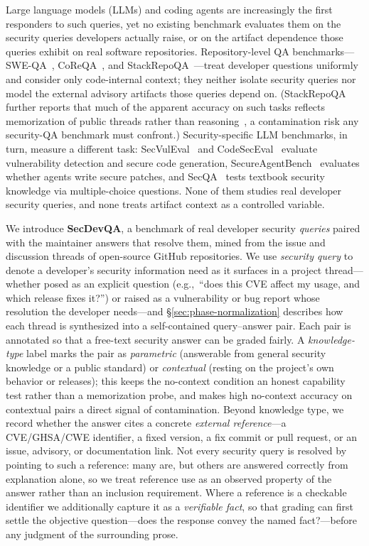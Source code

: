 Large language models (LLMs) and coding agents are increasingly the first responders to such queries, yet no existing benchmark evaluates them on the security queries developers actually raise, or on the artifact dependence those queries exhibit on real software repositories. Repository-level QA benchmarks---SWE-QA~\cite{sweqa2026}, CoReQA~\cite{coreqa2025}, and StackRepoQA~\cite{stackrepoqa2025}---treat developer questions uniformly and consider only code-internal context; they neither isolate security queries nor model the external advisory artifacts those queries depend on. (StackRepoQA further reports that much of the apparent accuracy on such tasks reflects memorization of public threads rather than reasoning~\cite{stackrepoqa2025}, a contamination risk any security-QA benchmark must confront.) Security-specific LLM benchmarks, in turn, measure a different task: SecVulEval~\cite{secvuleval2025} and CodeSecEval~\cite{codeseceval2024} evaluate vulnerability detection and secure code generation, SecureAgentBench~\cite{secureagentbench2025} evaluates whether agents write secure patches, and SecQA~\cite{secqa2023} tests textbook security knowledge via multiple-choice questions. None of them studies real developer security queries, and none treats artifact context as a controlled variable.

We introduce \textbf{SecDevQA}, a benchmark of real developer security \emph{queries} paired with the maintainer answers that resolve them, mined from the issue and discussion threads of open-source GitHub repositories. We use \emph{security query} to denote a developer's security information need as it surfaces in a project thread---whether posed as an explicit question (e.g.,\ ``does this CVE affect my usage, and which release fixes it?'') or raised as a vulnerability or bug report whose resolution the developer needs---and \S\ref{sec:phase-normalization} describes how each thread is synthesized into a self-contained query--answer pair. Each pair is annotated so that a free-text security answer can be graded fairly. A \emph{knowledge-type} label marks the pair as \emph{parametric} (answerable from general security knowledge or a public standard) or \emph{contextual} (resting on the project's own behavior or releases); this keeps the no-context condition an honest capability test rather than a memorization probe, and makes high no-context accuracy on contextual pairs a direct signal of contamination. Beyond knowledge type, we record whether the answer cites a concrete \emph{external reference}---a CVE/GHSA/CWE identifier, a fixed version, a fix commit or pull request, or an issue, advisory, or documentation link. Not every security query is resolved by pointing to such a reference: many are, but others are answered correctly from explanation alone, so we treat reference use as an observed property of the answer rather than an inclusion requirement. Where a reference is a checkable identifier we additionally capture it as a \emph{verifiable fact}, so that grading can first settle the objective question---does the response convey the named fact?---before any judgment of the surrounding prose.

